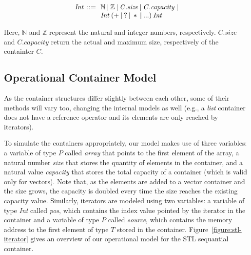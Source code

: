 \documentclass[conference]{IEEEtran}
\begin{document}
{\[\begin{array}{r@{\:\:}c@{\:\:}l}
\mathit{Int}  & ::= & \: \mathbb{N} \: | \: \mathbb{Z} \: | \: \mathit{C.size} \: | \: \mathit{C.capacity} \: | \\
              &     & \: \mathit{Int} \: ( + \: | \: ? \: | \: * \: | \: ...) \: \mathit{Int}  \:
\end{array}
\]

\noindent
Here, $\mathbb{N}$ and $\mathbb{Z}$ represent the natural
and integer numbers, respectively. $\mathit{C.size}$ and $\mathit{C.capacity}$
return the actual and maximum size, respectively of the containter $C$.

}%

\subsection{Operational Container Model}

As the container structures differ slightly
between each other, some of their methods will vary too,
changing the internal models as well (e.g., a \textit{list}
container does not have a reference operator and its elements
are only reached by iterators).

To simulate the containers appropriately, our model makes
use of three variables: a variable of type $P$ called \emph{array} that points
to the first element of the array, a natural number \emph{size} that stores
the quantity of elements in the container, and a natural value \emph{capacity}
that stores the total capacity of a container (which is valid only for vectors).
Note that, as the elements are added to a vector container
and the size grows, the capacity is doubled every time
the size reaches the existing capacity value. Similarly, iterators are modeled using
two variables: a variable of type \textit{Int} called \emph{pos},
which contains the index value pointed by the iterator in the container and a
variable of type $P$ called \emph{source}, which contains the memory address to the first
element of type $T$ stored in the container. Figure~\ref{figure:stl-iterator} gives
an overview of our operational model for the STL sequantial container.
\end{document}
